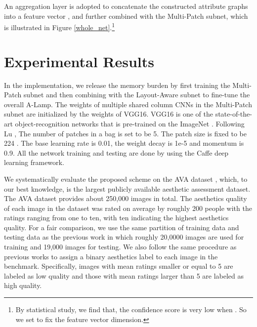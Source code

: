 \documentclass[10pt,twocolumn,letterpaper]{article}
\begin{document}
	An aggregation layer is adopted to concatenate the constructed attribute graphs into a feature vector , and further combined with the Multi-Patch subnet, which is illustrated in Figure \ref{whole_net}.\footnote[2]{By statistical study, we find that, the confidence score is very low when . So we set  to fix the feature vector  dimension.} 
	
	\section{Experimental Results} \label{experiments}
	In the implementation, we release the memory burden by first training the Multi-Patch subnet and then combining with the Layout-Aware subnet to fine-tune the overall A-Lamp. The weights of multiple shared column CNNs in the Multi-Patch subnet are initialized by the weights of VGG16. VGG16 is one of the state-of-the-art object-recognition networks that is pre-trained on the ImageNet \cite{Alex:2012:NIPS:ImageNet}.  
	Following Lu \cite{Lu:2015:ICCV}, The number of patches in a bag is set to be 5. The patch size is fixed to be 224 . The base learning rate is 0.01, the weight decay is 1e-5 and momentum is 0.9.  
	All the network training and testing are done by using the Caffe deep learning framework\cite{Jia:2014:ACMMM:caffe}. 
	
	We systematically evaluate the proposed scheme on the AVA dataset \cite{Murray:MMP2012:AVA}, which, to our best knowledge, is the largest publicly available aesthetic assessment dataset. The AVA dataset provides about 250,000 images in total. The aesthetics quality of each image in the dataset was rated on average by roughly 200 people with the ratings ranging from one to ten, with ten indicating the highest aesthetics quality. For a fair comparison, we use the same partition of training data and testing data as the previous
	work \cite{Lu:2014:ACMMM,Lu:2015:ICCV,Mai:2016:CVPR,Murray:MMP2012:AVA} in which roughly 20,0000 images are used for training and 19,000 images for testing. We also follow the same procedure as previous works to assign a binary aesthetics label to each image in the benchmark. Specifically, images with mean ratings smaller or equal to 5 are labeled as low quality and those with mean ratings larger than 5 are labeled as high quality.
	
\end{document}
